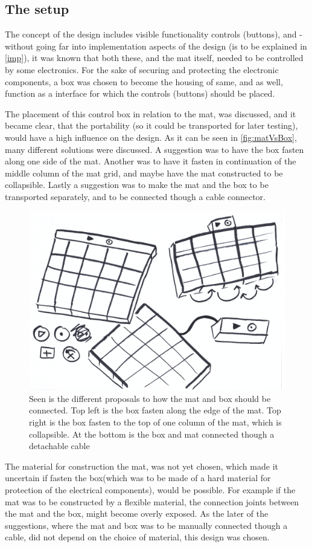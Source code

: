 \subsection{The setup}
The concept of the design includes visible functionality controls (buttons), and - without going far into implementation aspects of the design (is to be explained in \autoref{imp}), it was known that both these, and the mat itself, needed to be controlled by some electronics. For the sake of securing and protecting the electronic components, a box was chosen to become the housing of same, and as well, function as a interface for which the controls (buttons) should be placed. 

The placement of this control box in relation to the mat, was discussed, and it became clear, that the portability (so it could be transported for later testing), would have a high influence on the design. As it can be seen in \autoref{fig:matVsBox}, many different solutions were discussed. A suggestion was to have the box fasten along one side of the mat. Another was to have it fasten in continuation of the middle column of the mat grid, and maybe have the mat constructed to be collapsible. Lastly a suggestion was to make the mat and the box to be transported separately, and to be connected though a cable connector.     

\begin{figure}[H]
	\centering
	\includegraphics[width=0.7\linewidth]{figure/Design/maatteSetup}
	\caption{Seen is the different proposals to how the mat and box should be connected. Top left is the box fasten along the edge of the mat. Top right is the box fasten to the top of one column of the mat, which is collapsible. At the bottom is the box and mat connected though a detachable cable}
	\label{fig:matVsBox}
\end{figure} 

The material for construction the mat, was not yet chosen, which made it uncertain if fasten the box(which was to be made of a hard material for protection of the electrical components), would be possible. For example if the mat was to be constructed by a flexible material, the connection joints between the mat and the box, might become overly exposed.
As the later of the suggestions, where the mat and box was to be manually connected though a cable, did not depend on the choice of material, this design was chosen. 


